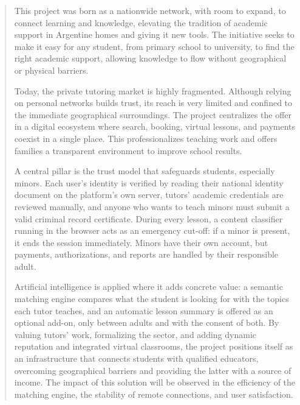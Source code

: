 
\begin{abstract}

This project was born as a nationwide network, with room to expand, to
connect learning and knowledge, elevating the tradition of academic
support in Argentine homes and giving it new tools. The initiative seeks
to make it easy for any student, from primary school to university, to
find the right academic support, allowing knowledge to flow without
geographical or physical barriers.

Today, the private tutoring market is highly fragmented. Although
relying on personal networks builds trust, its reach is very limited and
confined to the immediate geographical surroundings. The project
centralizes the offer in a digital ecosystem where search, booking,
virtual lessons, and payments coexist in a single place. This
professionalizes teaching work and offers families a transparent
environment to improve school results.

A central pillar is the trust model that safeguards students, especially
minors. Each user's identity is verified by reading their national
identity document on the platform's own server, tutors' academic
credentials are reviewed manually, and anyone who wants to teach minors
must submit a valid criminal record certificate. During every lesson, a
content classifier running in the browser acts as an emergency cut-off:
if a minor is present, it ends the session immediately. Minors have
their own account, but payments, authorizations, and reports are handled
by their responsible adult.

Artificial intelligence is applied where it adds concrete value: a
semantic matching engine compares what the student is looking for with
the topics each tutor teaches, and an automatic lesson summary is
offered as an optional add-on, only between adults and with the consent
of both. By valuing tutors' work, formalizing the sector, and adding
dynamic reputation and integrated virtual classrooms, the project
positions itself as an infrastructure that connects students with
qualified educators, overcoming geographical barriers and providing the
latter with a source of income. The impact of this solution will be
observed in the efficiency of the matching engine, the stability of
remote connections, and user satisfaction.

\end{abstract}
